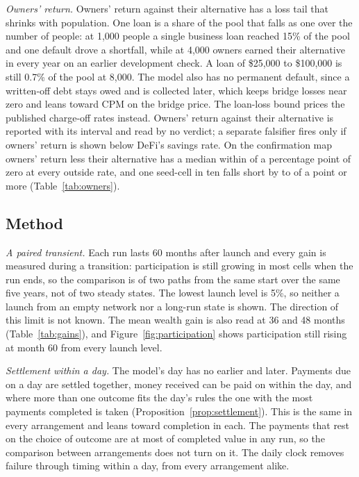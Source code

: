 \emph{Owners' return.} Owners' return against their alternative has a loss tail that shrinks with population. One
loan is a share of the pool that falls as one over the number of people: at 1,000 people a single business loan reached 15\% of the
pool and one default drove a shortfall, while at 4,000 owners earned their alternative in every year on an earlier
development check. A loan of \$25,000 to \$100,000 is still 0.7\% of the pool at 8,000. The model also has no permanent default,
since a written-off debt stays owed and is collected later, which keeps bridge losses near zero and leans toward
CPM on the bridge price. The loan-loss bound prices the published charge-off rates instead. Owners' return against
their alternative is reported with its interval and read by no verdict; a separate falsifier fires only if owners'
return is shown below DeFi's savings rate. On the confirmation map owners' return less their alternative has a
median within \OwnersMedianWorst{} of a percentage point of zero at every outside rate, and one seed-cell in ten falls
short by \OwnersTenthLeast{} to \OwnersTenthWorst{} of a point or more (Table~\ref{tab:owners}).

\subsection{Method}

\emph{A paired transient.} Each run lasts 60 months after launch and every gain is measured during a transition:
participation is still growing in most cells when the run ends, so the comparison is of two paths from the same
start over the same five years, not of two steady states. The lowest launch level is 5\%, so neither a launch from
an empty network nor a long-run state is shown. The direction of this limit is not known. The mean wealth gain is
also read at 36 and 48 months (Table~\ref{tab:gains}), and Figure~\ref{fig:participation} shows participation still
rising at month 60 from every launch level.

\emph{Settlement within a day.} The model's day has no earlier and later. Payments due on a day are settled
together, money received can be paid on within the day, and where more than one outcome fits the
day's rules the one with the most payments completed is taken (Proposition~\ref{prop:settlement}). This is the same
in every arrangement and leans toward completion in each. The payments that rest on the choice of outcome are at
most \NettingShareMost{} of completed value in any run, so the comparison between arrangements does not turn on
it. The daily clock removes failure through timing within a day, from every arrangement alike.

